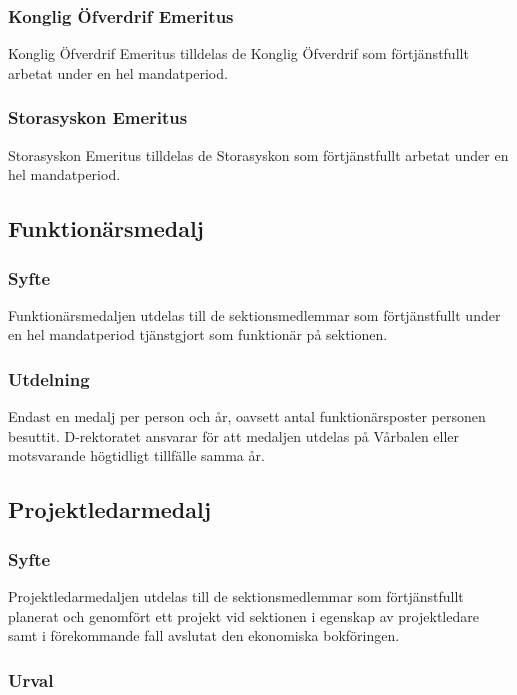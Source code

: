 \documentclass{dgovdoc}
\begin{document}
\subsubsection{Konglig Öfverdrif Emeritus}

Konglig Öfverdrif Emeritus tilldelas de Konglig Öfverdrif som förtjänstfullt
arbetat under en hel mandatperiod.

\subsubsection{Storasyskon Emeritus}

Storasyskon Emeritus tilldelas de Storasyskon som förtjänstfullt arbetat under
en hel mandatperiod.

\subsection{Funktionärsmedalj}

\subsubsection{Syfte}

Funktionärsmedaljen utdelas till de sektionsmedlemmar som förtjänstfullt under
en hel mandatperiod tjänstgjort som funktionär på sektionen.

\subsubsection{Utdelning}

Endast en medalj per person och år, oavsett antal funktionärsposter personen
besuttit. D-rektoratet ansvarar för att medaljen utdelas på Vårbalen eller
motsvarande högtidligt tillfälle samma år.

\subsection{Projektledarmedalj}

\subsubsection{Syfte}

Projektledarmedaljen utdelas till de sektionsmedlemmar som förtjänstfullt
planerat och genomfört ett projekt vid sektionen i egenskap av projektledare
samt i förekommande fall avslutat den ekonomiska bokföringen.

\subsubsection{Urval}
\end{document}
